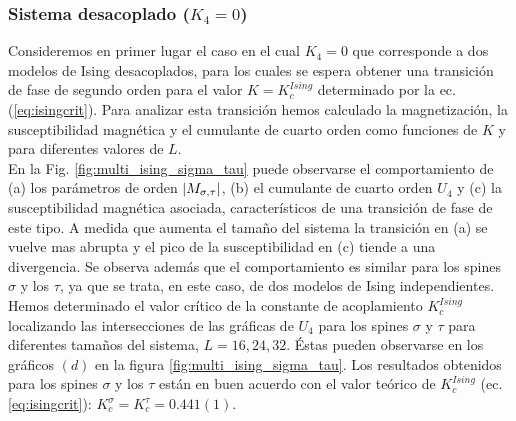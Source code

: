 
\subsubsection{Sistema desacoplado ($K_{4}=0$)}

Consideremos en primer lugar el caso en el cual $K_{4}=0$ que corresponde a dos modelos de Ising desacoplados, para los cuales
 se espera obtener una transición de fase de segundo orden para el valor $K = K_{c}^{Ising}$ determinado por la ec. (\ref{eq:isingcrit}).
 Para analizar esta transición hemos calculado la magnetización, la susceptibilidad magnética y el cumulante de cuarto orden
 como funciones de $K$ y para diferentes valores de $L$.\\
En la Fig. \ref{fig:multi_ising_sigma_tau} puede observarse el comportamiento de (a) los parámetros de orden $\left\vert M_{\sigma,\tau}\right\vert$, (b) el cumulante de cuarto orden $U_{4}$ y
 (c) la susceptibilidad magnética asociada, característicos
 de una transición de fase de este tipo. A medida que aumenta el tamaño del sistema la transición en (a) se vuelve mas abrupta y el pico de la susceptibilidad en (c) tiende
 a una divergencia. Se observa además que el comportamiento es similar para los spines $\sigma$ y los $\tau$, ya que se trata, en este caso, de dos modelos de Ising independientes.\\
 
Hemos determinado el valor crítico de la constante de acoplamiento $K_{c}^{Ising}$ localizando las intersecciones de las gráficas de $U_{4}$
 para los spines $\sigma$ y $\tau$ para diferentes tamaños del sistema, $L=16,24,32$. Éstas pueden observarse en los gráficos $(d)$ en la figura \ref{fig:multi_ising_sigma_tau}.
 Los resultados obtenidos para los spines $\sigma$ y los $\tau$ están en buen acuerdo con el valor teórico de $K_{c}^{Ising}$ (ec. \ref{eq:isingcrit}):
 $K_{c}^{\sigma}=K_{c}^{\tau}=0.441(1)$.\\


